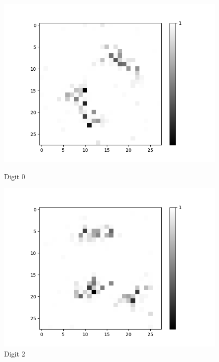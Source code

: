 \begin{figure}[H]
	\centering
	\begin{minipage}[b]{0.19\textwidth}
		\captionsetup{labelformat=empty}
		\includegraphics[width=\textwidth]{AND(LSM)/Positive/Layer0-Neuron-0.png}
		\caption{Digit 0}
	\end{minipage}
	\begin{minipage}[b]{0.19\textwidth}
		\captionsetup{labelformat=empty}
		\includegraphics[width=\textwidth]{AND(LSM)/Positive/Layer0-Neuron-2.png}
		\caption{Digit 2}
	\end{minipage}
	\begin{minipage}[b]{0.19\textwidth}
		\captionsetup{labelformat=empty}

\end{minipage}
\end{figure}
